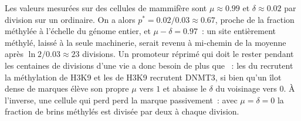 \begin{example}\label{ex:b3:chromatin-epigenetics:maintenance-numbers}
Les valeurs mesurées sur des cellules de mammifère sont
$\mu \approx 0.99$ et $\delta \approx 0.02$ par division sur un 
ordinaire. On a alors $p^{*} =
0.02/0.03 \approx 0.67$, proche de la fraction méthylée à l'échelle du
génome entier, et $\mu - \delta = 0.97$~: un site entièrement méthylé,
laissé à la seule machinerie, serait revenu à mi-chemin de la moyenne
après $\ln 2 /
0.03 \approx 23$ divisions. Un promoteur réprimé qui doit le rester
pendant les centaines de divisions d'une vie a donc besoin de plus que
~: les  du  recrutent la méthylation de H3K9 et
les  de H3K9 recrutent DNMT3, si bien qu'un îlot dense de
marques élève son propre $\mu$ vers $1$ et abaisse le $\delta$ du
voisinage vers $0$. À l'inverse, une cellule qui perd  perd la
marque passivement~: avec $\mu = \delta = 0$ la fraction de brins
méthylés est divisée par deux à chaque division.
\end{example}

